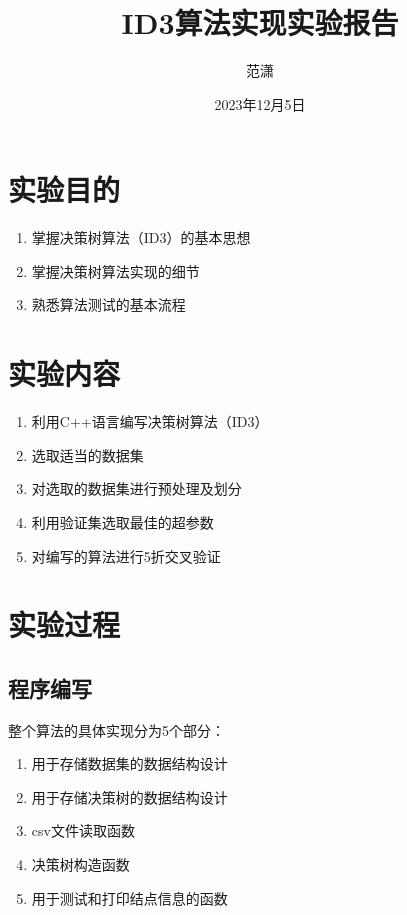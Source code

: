 \documentclass[a4paper,11pt]{article}%
\author{范潇}
\title{ID3算法实现实验报告}
\date{2023年12月5日}
\theoremstyle{remark}
\theoremstyle{remark}
\theoremstyle{definition}
\theoremstyle{definition}
\theoremstyle{definition}
\begin{document}
\lstset{breaklines}%
		\lstset{extendedchars=false}%
\pagestyle{plain}
\maketitle
\section{实验目的}
\begin{enumerate}
    \item 掌握决策树算法（ID3）的基本思想
    \item 掌握决策树算法实现的细节
    \item 熟悉算法测试的基本流程
\end{enumerate}
\section{实验内容}
\begin{enumerate}
    \item 利用C++语言编写决策树算法（ID3）
    \item 选取适当的数据集
    \item 对选取的数据集进行预处理及划分
    \item 利用验证集选取最佳的超参数
    \item 对编写的算法进行5折交叉验证
\end{enumerate}
\section{实验过程}
\subsection{程序编写}
整个算法的具体实现分为5个部分：
\begin{enumerate}
    \item 用于存储数据集的数据结构设计
    \item 用于存储决策树的数据结构设计
    \item csv文件读取函数
    \item 决策树构造函数
    \item 用于测试和打印结点信息的函数
\end{enumerate}
\end{document}
